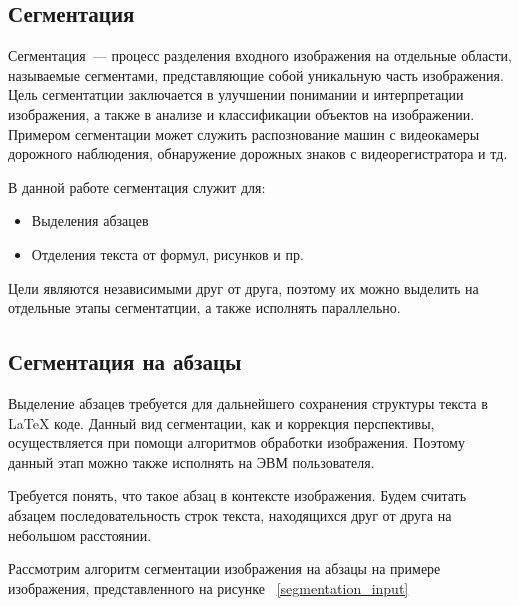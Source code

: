 \subsection{Сегментация}

Сегментация~--- процесс разделения входного изображения на отдельные области, называемые сегментами, представляющие собой уникальную часть изображения. Цель сегментатции заключается в улучшении понимании и интерпретации изображения, а также в анализе и классификации объектов на изображении.
Примером сегментации может служить распознование машин с видеокамеры дорожного наблюдения, обнаружение дорожных знаков с видеорегистратора и тд.

В данной работе сегментация служит для:
\begin{itemize}
    \item Выделения абзацев
    \item Отделения текста от формул, рисунков и пр.
\end{itemize}

Цели являются независимыми друг от друга, поэтому их можно выделить на отдельные этапы сегментатции, а также исполнять параллельно. 

\subsection{Сегментация на абзацы}

Выделение абзацев требуется для дальнейшего сохранения структуры текста в \LaTeX\; коде. Данный вид сегментации, как и коррекция перспективы, осуществляется при помощи алгоритмов обработки изображения.
Поэтому данный этап можно также исполнять на ЭВМ пользователя.

Требуется понять, что такое абзац в контексте изображения. Будем считать абзацем последовательность строк текста, находящихся друг от друга на небольшом расстоянии.

Рассмотрим алгоритм сегментации изображения на абзацы на примере изображения, представленного на рисунке ~\ref{segmentation_input}

